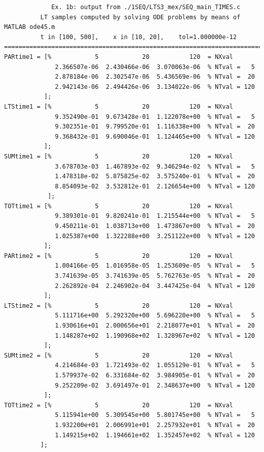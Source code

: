 \documentclass[a4paper,10pt]{report}%
\begin{document}
\begin{lstlisting}
             Ex. 1b: output from ./1SEQ/LTS3_mex/SEQ_main_TIMES.c
          LT samples computed by solving ODE problems by means of MATLAB ode45.m
          t in [100, 500],    x in [10, 20],    tol=1.000000e-12
====================================================================================
PARtime1 = [%            5            20           120  = NXval
              2.366507e-06  2.430466e-06  3.070063e-06	% NTval =   5
              2.878184e-06  2.302547e-06  5.436569e-06	% NTval =  20
              2.942143e-06  2.494426e-06  3.134022e-06	% NTval = 120
           ];
LTStime1 = [%            5            20           120  = NXval
              9.352490e-01  9.673428e-01  1.122078e+00	% NTval =   5
              9.302351e-01  9.799520e-01  1.116338e+00	% NTval =  20
              9.368432e-01  9.690046e-01  1.124465e+00	% NTval = 120
           ];
SUMtime1 = [%            5            20           120  = NXval
              3.678703e-03  1.467893e-02  9.346294e-02	% NTval =   5
              1.478318e-02  5.875825e-02  3.575240e-01	% NTval =  20
              8.854093e-02  3.532812e-01  2.126654e+00	% NTval = 120
            ];
TOTtime1 = [%            5            20           120  = NXval
              9.389301e-01  9.820241e-01  1.215544e+00	% NTval =   5
              9.450211e-01  1.038713e+00  1.473867e+00	% NTval =  20
              1.025387e+00  1.322288e+00  3.251122e+00	% NTval = 120
           ];
PARtime2 = [%            5            20           120  = NXval
              1.004166e-05  1.016958e-05  1.253609e-05	% NTval =   5
              3.741639e-05  3.741639e-05  5.762763e-05	% NTval =  20
              2.262892e-04  2.246902e-04  3.447425e-04	% NTval = 120
           ];
LTStime2 = [%            5            20           120  = NXval
              5.111716e+00  5.292320e+00  5.696220e+00	% NTval =   5
              1.930616e+01  2.000656e+01  2.218077e+01	% NTval =  20
              1.148287e+02  1.190968e+02  1.328967e+02	% NTval = 120
           ];
SUMtime2 = [%            5            20           120  = NXval
              4.214684e-03  1.721493e-02  1.055129e-01	% NTval =   5
              1.579937e-02  6.331684e-02  3.984905e-01	% NTval =  20
              9.252209e-02  3.691497e-01  2.348637e+00	% NTval = 120
           ];
TOTtime2 = [%            5            20           120  = NXval
              5.115941e+00  5.309545e+00  5.801745e+00	% NTval =   5
              1.932200e+01  2.006991e+01  2.257932e+01	% NTval =  20
              1.149215e+02  1.194661e+02  1.352457e+02	% NTval = 120
          ];
\end{lstlisting}
\end{document}
